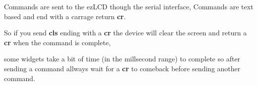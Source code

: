  Commands are sent to the ez\-L\-C\-D though the serial interface, Commands are text based and end with a carrage return {\bfseries cr}.\par
 So if you send {\bfseries cls} ending with a {\bfseries cr} the device will clear the screen and return a {\bfseries cr} when the command is complete,\par
 some widgets take a bit of time (in the millsecond range) to complete so after sending a command allways wait for a {\bfseries cr} to comeback before sending another command.\par
